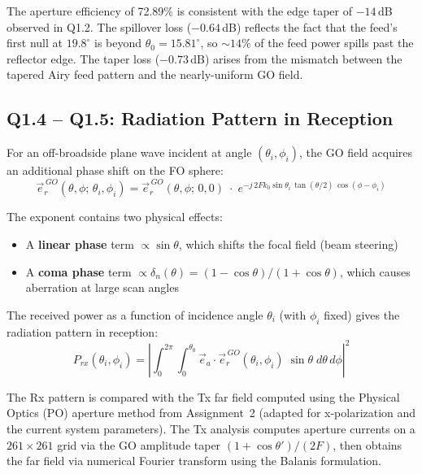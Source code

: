\documentclass{article}
\begin{document}
The aperture efficiency of 72.89\% is consistent with the edge taper of $-14$\,dB observed in Q1.2. The spillover loss ($-0.64$\,dB) reflects the fact that the feed's first null at $19.8^\circ$ is beyond $\theta_0 = 15.81^\circ$, so ${\sim}14\%$ of the feed power spills past the reflector edge. The taper loss ($-0.73$\,dB) arises from the mismatch between the tapered Airy feed pattern and the nearly-uniform GO field.

\subsection{Q1.4 -- Q1.5: Radiation Pattern in Reception}

For an off-broadside plane wave incident at angle $(\theta_i, \phi_i)$, the GO field acquires an additional phase shift on the FO sphere:
\begin{equation}\label{eq:GO_offbroadside}
\vec{e}_r^{\,GO}(\theta,\phi;\,\theta_i,\phi_i) = \vec{e}_r^{\,GO}(\theta,\phi;\,0,0)\;\cdot\;e^{-j\,2Fk_0\sin\theta_i\,\tan(\theta/2)\,\cos(\phi-\phi_i)}
\end{equation}

The exponent contains two physical effects:
\begin{itemize}
\item A \textbf{linear phase} term $\propto \sin\theta$, which shifts the focal field (beam steering)
\item A \textbf{coma phase} term $\propto \delta_n(\theta) = (1-\cos\theta)/(1+\cos\theta)$, which causes aberration at large scan angles
\end{itemize}

The received power as a function of incidence angle $\theta_i$ (with $\phi_i$ fixed) gives the radiation pattern in reception:
\begin{equation}\label{eq:Prx}
P_{rx}(\theta_i,\phi_i) = \left|\int_0^{2\pi}\!\int_0^{\theta_0} \vec{e}_a \cdot \vec{e}_r^{\,GO}(\theta_i,\phi_i)\;\sin\theta\;d\theta\,d\phi\right|^2
\end{equation}

The Rx pattern is compared with the Tx far field computed using the Physical Optics (PO) aperture method from Assignment~2 (adapted for x-polarization and the current system parameters). The Tx analysis computes aperture currents on a $261\times261$ grid via the GO amplitude taper $(1+\cos\theta')/(2F)$, then obtains the far field via numerical Fourier transform using the Balanis formulation.
\end{document}
